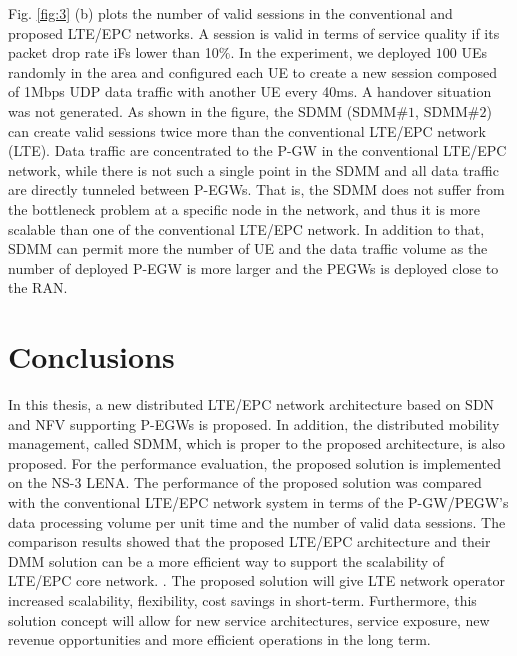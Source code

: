 \documentclass[runningheads,a4paper]{llncs}
\begin{document}
Fig. \ref{fig:3} (b) plots the number of valid sessions in the conventional and proposed LTE/EPC networks. A session is valid in terms of service quality if its packet drop rate iFs lower than 10$\%$. In the experiment, we deployed $100$ UEs randomly in the area and configured each UE to create a new session composed of 1Mbps UDP data traffic with another UE every 40ms. A handover situation was not generated. As shown in the figure, the SDMM (SDMM$\#1$, SDMM$\#2$) can create valid sessions twice more than the conventional LTE/EPC network (LTE). Data traffic are concentrated to the P-GW in the conventional LTE/EPC network, while there is not such a single point in the SDMM and all data traffic are directly tunneled between P-EGWs. That is, the SDMM does not suffer from the bottleneck problem at a specific node in the network, and thus it is more scalable than one of the conventional LTE/EPC network. In addition to that, SDMM can permit more the number of UE and the data traffic volume as the number of deployed P-EGW is more larger and the PEGWs is deployed close to the RAN.


\section{Conclusions}


In this thesis, a new distributed LTE/EPC network architecture based on SDN and NFV supporting P-EGWs is proposed. In addition, the distributed mobility management, called SDMM, which is proper to the proposed architecture, is also proposed. For the performance evaluation, the proposed solution is implemented on the NS-3 LENA. The performance of the proposed solution was compared with the conventional LTE/EPC network system in terms of the P-GW/PEGW's data processing volume per unit time and the number of valid data sessions. The comparison results showed that the proposed LTE/EPC architecture and their DMM solution can be a more efficient way to support the scalability of LTE/EPC core network.
.
The proposed solution will give LTE network operator increased scalability, flexibility, cost savings in short-term. Furthermore, this solution concept will allow for new service architectures, service exposure, new revenue opportunities and more efficient operations in the long term.

\end{document}
